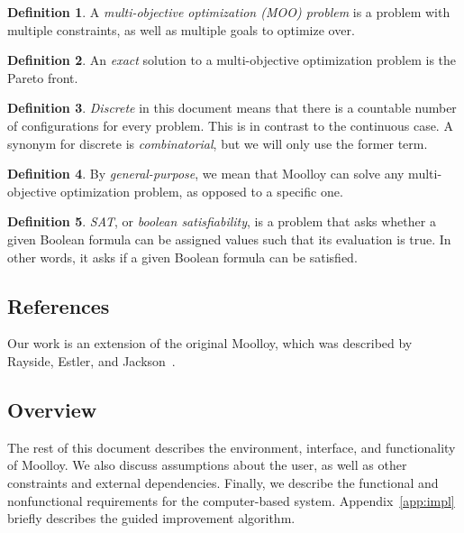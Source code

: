 \documentclass[11pt]{article}
\theoremstyle{definition}
\newtheorem{mydef}{Definition}
\begin{document}
\begin{mydef}
A \textit{multi-objective optimization (MOO) problem} is a problem with
multiple constraints, as well as multiple goals to optimize over.
\end{mydef}

\begin{mydef}
An \textit{exact} solution to a multi-objective optimization problem is
the Pareto front.
\end{mydef}

\begin{mydef}
\textit{Discrete} in this document means that there is a countable
number of configurations for every problem. This is in contrast to the
continuous case. A synonym for discrete is \textit{combinatorial}, but
we will only use the former term.  \end{mydef}

\begin{mydef}
By \textit{general-purpose}, we mean that Moolloy can solve any
multi-objective optimization problem, as opposed to a specific one.
\end{mydef}

\begin{mydef}
\textit{SAT}, or \textit{boolean satisfiability}, is a problem that
asks whether a given Boolean formula can be assigned values such that
its evaluation is true. In other words, it asks if a given Boolean
formula can be satisfied.
\end{mydef}

\subsection{References}\label{sec:ref}

Our work is an extension of the original Moolloy, which was described
by Rayside, Estler, and Jackson~\cite{ref:Rayside09}.

\subsection{Overview}\label{sec:overview}

The rest of this document describes the environment, interface, and
functionality of Moolloy. We also discuss assumptions about the user,
as well as other constraints and external dependencies. Finally, we
describe the functional and nonfunctional requirements for the
computer-based system. Appendix~\ref{app:impl} briefly describes the
guided improvement algorithm.
\end{document}
